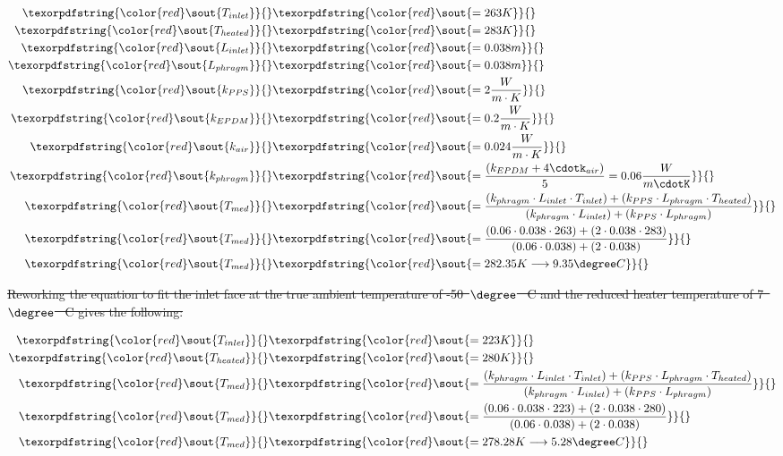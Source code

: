 \documentclass[a4paper,12pt,twoside]{article}
\providecommand{\DIFdeltex}[1]{{\protect\color{red}\sout{#1}}}                      %
\providecommand{\DIFdel}[1]{\texorpdfstring{\DIFdeltex{#1}}{}} %
\begin{document}
\begin{align*}
    \DIFdel{T_{inlet} }&\DIFdel{= 263 K}\\
    \DIFdel{T_{heated} }&\DIFdel{= 283 K}\\
    \DIFdel{L_{inlet} }&\DIFdel{= 0.038 m}\\
    \DIFdel{L_{phragm} }&\DIFdel{= 0.038 m}\\
    \DIFdel{k_{PPS} }&\DIFdel{= 2\frac{W}{m\cdot K}}\\
    \DIFdel{k_{EPDM} }&\DIFdel{= 0.2\frac{W}{m\cdot K}}\\
    \DIFdel{k_{air} }&\DIFdel{= 0.024\frac{W}{m\cdot K}}\\
    \DIFdel{k_{phragm} }&\DIFdel{=  \frac{(k_{EPDM}+4\cdotk_{air})}{5} = 0.06\frac{W}{m\cdotK}}\\
    \DIFdel{T_{med} }&\DIFdel{= \frac{( k_{phragm}\cdot   L_{inlet}\cdot T_{inlet}) + (k_{PPS}\cdot L_{phragm}\cdot T_{heated}) }{ (k_{phragm}\cdot L_{inlet}) + (k_{PPS} \cdot L_{phragm})} }\\
    \DIFdel{T_{med} }&\DIFdel{= \frac{ (0.06\cdot  0.038\cdot 263) + (2\cdot 0.038\cdot 283)}{(0.06\cdot 0.038) + (2\cdot 0.038)} }\\
    \DIFdel{T_{med} }&\DIFdel{= 282.35 K \longrightarrow 9.35\degree C
 }\end{align*}

\DIFdel{Reworking the equation to fit the inlet face at the true ambient temperature of -50\mbox{%
$\degree$
}%
C and the reduced heater temperature of 7\mbox{%
$\degree$
}%
C gives the following:
}%


\begin{align*}
     \DIFdel{T_{inlet} }&\DIFdel{= 223 K}\\
    \DIFdel{T_{heated} }&\DIFdel{= 280 K}\\
    \DIFdel{T_{med} }&\DIFdel{= \frac{ (k_{phragm}\cdot L_{inlet}\cdot T_{inlet}) + (k_{PPS}\cdot L_{phragm}\cdot T_{heated}) }{ (k_{phragm}\cdot L_{inlet}) + (k_{PPS}\cdot L_{phragm})}}\\
    \DIFdel{T_{med} }&\DIFdel{= \frac{ (0.06\cdot 0.038\cdot 223) + (2\cdot 0.038\cdot 280)}{(0.06\cdot 0.038) + (2\cdot 0.038)}}\\
    \DIFdel{T_{med} }&\DIFdel{= 278.28 K \longrightarrow 5.28\degree C
 }\end{align*}
\end{document}
